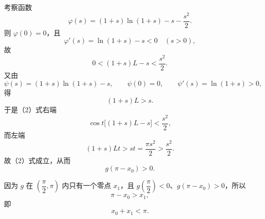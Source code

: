 \begin{answer}
考察函数
\nopagebreak[4]
\[\varphi(s)=(1+s)\ln(1+s)-s-\frac{s^2}{2}.\]
则 $\varphi(0)=0$，且
\nopagebreak[4]
\[\varphi'(s)=\ln(1+s)-s<0\quad(s>0),\]
故
\nopagebreak[4]
\[0<(1+s)L-s<\frac{s^2}{2}.\]
又由
\nopagebreak[4]
\[\psi(s)=(1+s)\ln(1+s)-s,\qquad
\psi(0)=0,\qquad \psi'(s)=\ln(1+s)>0,\]
得
\nopagebreak[4]
\[(1+s)L>s.\]
于是（2）式右端
\nopagebreak[4]
\[\cos t\bigl[(1+s)L-s\bigr]<\frac{s^2}{2},\]
而左端
\nopagebreak[4]
\[(1+s)Lt>st=\frac{\pi s^2}{2}>\frac{s^2}{2}.\]
故（2）式成立，从而
\nopagebreak[4]
\[g(\pi-x_0)>0.\]

因为 $g$ 在 $\left(\dfrac\pi2,\pi\right)$ 内只有一个零点 $x_1$，且 $g\left(\dfrac\pi2\right)<0$、$g(\pi-x_0)>0$，所以
\nopagebreak[4]
\[\pi-x_0>x_1,\]
即
\nopagebreak[4]
\[x_0+x_1<\pi.\]



\end{answer}
